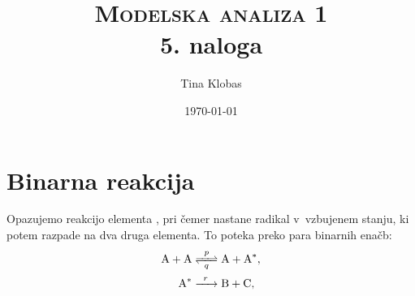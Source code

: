 \documentclass[a4paper,pdftex,12pt]{article}
\title{	
\normalfont \normalsize 
\textsc{Modelska analiza 1} \\ [25pt] %
\huge 5. naloga\\ %
}
\author{Tina Klobas} %
\date{\normalsize\today} %
\numberwithin{figure}{section} %
\begin{document}
\maketitle %


\section{Binarna reakcija}
Opazujemo reakcijo elementa , pri čemer nastane radikal v~vzbujenem stanju, ki potem
razpade na dva druga elementa. To poteka preko para binarnih enačb:
\begin{align}\label{reakcija1}
    \ce{A + A &<=>[\ce{$p$}][\ce{$q$}] A + A^*}, \\
    \ce{A^* &->[\ce{$r$}] B + C},
\end{align}
\end{document}

